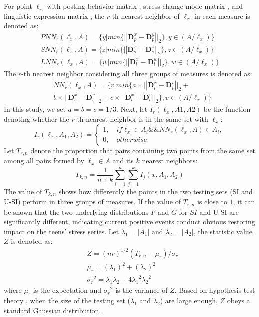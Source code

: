 For point $\ell_x$ with posting behavior matrix , stress change mode matrix ,
and linguistic expression matrix ,
the $r$-th nearest neighbor of $\ell_x$ in each measure is denoted as:
\begin{equation}
\begin{aligned}
& PNN_r(\ell_x,A)
= \{y | min\{||\textbf{D}_p^x-\textbf{D}_p^y ||_2\}, y\in(A/\ell_x)\} &\\
& SNN_r(\ell_x,A)
= \{z | min\{||\textbf{D}_s^x-\textbf{D}_s^z ||_2\}, z\in(A/\ell_x)\} \\
& LNN_r(\ell_x,A)
= \{w | min\{||\textbf{D}_l^x-\textbf{D}_l^w ||_2\}, w\in(A/\ell_x)\} &
 \end{aligned}
 \end{equation}
The $r$-th nearest neighbor considering all three groups of measures is denoted as:
\begin{align}
&NN_r(\ell_x,A) = \{v | min\{a \times ||\textbf{D}_p^x-\textbf{D}_p^v||_2+\\
&b \times ||\textbf{D}_s^x-\textbf{D}_s^v||_2+
c \times ||\textbf{D}_l^x-\textbf{D}_l^v||_2\}, v\in(A/\ell_x) \}
\end{align}
In this study, we set $a = b = c = 1/3$.
Next, let $I_r(\ell_x,A1,A2)$ be the function denoting whether the $r$-th nearest neighbor is in the same set with $\ell_x$:
\begin{equation}
I_r(\ell_x,A_1,A_2) =
\left\{ \begin{array}{ll}
1, \quad if \ell_x \in A_i  \&\& NN_r(\ell_x,A)\in A_i,\\
0, \quad otherwise
\end{array}
\right.
\end{equation}
Let $T_{r,n}$ denote the proportion that pairs containing two points from the same set among all pairs formed by $\ell_x \in A$
and its $k$ nearest neighbors:
\begin{equation}
T_{k,n}= \frac{1}{n\times k}\sum_{i=1}^{n}\sum_{j=1}^{k}I_j(x,A_1,A_2)
\end{equation}
The value of $T_{k,n}$ shows how differently the points in the two testing sets (SI and U-SI) perform in three groups of measures.
If the value of $T_{r,n}$ is close to $1$,
it can be shown that the two underlying distributions $F$ and $G$ for $SI$ and U-SI are significantly different,
indicating current positive events conduct obvious restoring impact on the teens' stress series.
Let $\lambda_1=|A_1|$ and $\lambda_2=|A_2|$, the statistic value $Z$ is denoted as:
\begin{align}
&Z=(nr)^{1/2}(T_{r,n}-\mu_{r})/\sigma_{r}\\
&\mu_r=(\lambda_1)^2+(\lambda_2)^2\\
&{\sigma_r}^2=\lambda_1\lambda_2+4{\lambda_1}^2{\lambda_2}^2
\end{align}
where $\mu_r$ is the expectation and ${\sigma_r}^2$ is the variance of $Z$.
Based on hypothesis test theory \cite{Johnson2012Applied},
when the size of the testing set ($\lambda_1$ and $\lambda_2$) are large enough,
$Z$ obeys a standard Gaussian distribution.

